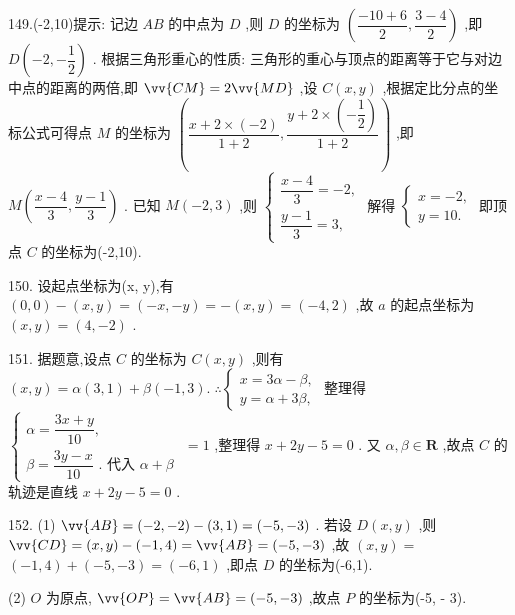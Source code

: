 149.(-2,10)提示: 记边 ${AB}$ 的中点为 $D$ ,则 $D$ 的坐标为 $\left( {\dfrac{-{10} + 6}{2},\dfrac{3 - 4}{2}}\right)$ ,即 $D\left( {-2, - \dfrac{1}{2}}\right)$ . 根据三角形重心的性质: 三角形的重心与顶点的距离等于它与对边中点的距离的两倍,即 $\vv{CM} = 2\vv{MD}$ ,设 $C\left( {x,y}\right)$ ,根据定比分点的坐标公式可得点 $M$ 的坐标为 $\left( {\dfrac{x + 2 \times  \left( {-2}\right) }{1 + 2},\dfrac{y + 2 \times  \left( {-\dfrac{1}{2}}\right) }{1 + 2}}\right)$ ,即 $M\left( {\dfrac{x - 4}{3},\dfrac{y - 1}{3}}\right)$ . 已知 $M\left( {-2,3}\right)$ ,则 $\left\{  \begin{array}{l} \dfrac{x - 4}{3} =  - 2, \\  \dfrac{y - 1}{3} = 3, \end{array}\right.$ 解得 $\left\{  \begin{array}{l} x =  - 2, \\  y = {10}. \end{array}\right.$ 即顶点 $C$ 的坐标为(-2,10).

150. 设起点坐标为(x, y),有 $\left( {0,0}\right)  - \left( {x,y}\right)  = \left( {-x, - y}\right)  =  - \left( {x,y}\right)  = \left( {-4,2}\right)$ ,故 $a$ 的起点坐标为 $\left( {x,y}\right)  = \left( {4, - 2}\right)$ .

151. 据题意,设点 $C$ 的坐标为 $C\left( {x,y}\right)$ ,则有 $\left( {x,y}\right)  = \alpha \left( {3,1}\right)  + \beta \left( {-1,3}\right) .\;\therefore \left\{  \begin{array}{l} x = {3\alpha } - \beta , \\  y = \alpha  + {3\beta }, \end{array}\right.$ 整理得 $\left\{  \begin{array}{l} \alpha  = \dfrac{{3x} + y}{10}, \\  \beta  = \dfrac{{3y} - x}{10}\text{ . 代入 }\alpha  + \beta  \end{array}\right.$  $= 1$ ,整理得 $x + {2y} - 5 = 0$ . 又 $\alpha ,\beta  \in  \mathbf{R}$ ,故点 $C$ 的轨迹是直线 $x + {2y} - 5 = 0$ .

152. (1) $\vv{AB} = \left( {-2, - 2}\right)  - \left( {3,1}\right)  = \left( {-5, - 3}\right)$ . 若设 $D\left( {x,y}\right)$ ,则 $\vv{CD} = \left( {x,y}\right)  - \left( {-1,4}\right)  = \vv{AB} = \left( {-5, - 3}\right)$ ,故 $\left( {x,y}\right)  =$  $\left( {-1,4}\right)  + \left( {-5, - 3}\right)  = \left( {-6,1}\right)$ ,即点 $D$ 的坐标为(-6,1).

(2) $O$ 为原点, $\vv{OP} = \vv{AB} = \left( {-5, - 3}\right)$ ,故点 $P$ 的坐标为(-5, - 3).

